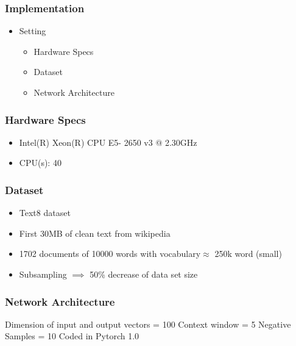 \begin{frame}\frametitle{Implementation}
\begin{itemize}
\item Setting
\begin{itemize}
\item Hardware Specs
\item Dataset 
\item Network Architecture 
\end{itemize}
\end{itemize}
\end{frame}
\begin{frame}
\frametitle{Hardware Specs} 
\begin{itemize}
\item Intel(R) Xeon(R) CPU E5- 2650 v3 @ 2.30GHz
\item CPU(s):                40
\end{itemize}
\end{frame}
\begin{frame}
\frametitle{Dataset} 
\begin{itemize}
\item Text8 dataset 
\item First 30MB of clean text from wikipedia 
\item 1702 documents of 10000 words  with vocabulary$\approx$ 250k word (small) 
\item Subsampling $\implies$ 50\% decrease of data set size
\end{itemize}
\end{frame}
\begin{frame}
\frametitle{Network Architecture} 
Dimension of input and output vectors = 100
Context window  = 5
Negative Samples = 10 
Coded in Pytorch 1.0
\end{frame}